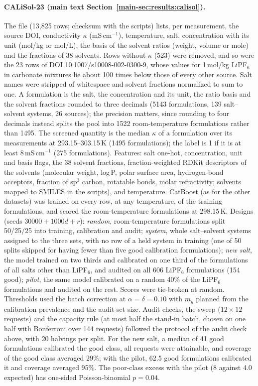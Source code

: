 \documentclass[10pt]{article}
\begin{document}
\paragraph{CALiSol-23 (main text Section~\ref{main-sec:results:calisol}).} The file (13,825 rows; checksum with the scripts) lists, per measurement, the source DOI, conductivity $\kappa$ (mS\,cm$^{-1}$), temperature, salt, concentration with its unit (mol/kg or mol/L), the basis of the solvent ratios (weight, volume or mole) and the fractions of 38 solvents.\citep{deBlasio2024CALiSol} Rows without $\kappa$ (523) were removed, and so were the 23 rows of DOI 10.1007/s10008-002-0300-9, whose values for 1\,mol/kg LiPF$_6$ in carbonate mixtures lie about 100 times below those of every other source. Salt names were stripped of whitespace and solvent fractions normalized to sum to one. A formulation is the salt, the concentration and its unit, the ratio basis and the solvent fractions rounded to three decimals (5143 formulations, 139 salt--solvent systems, 26 sources); the precision matters, since rounding to four decimals instead splits the pool into 1522 room-temperature formulations rather than 1495. The screened quantity is the median $\kappa$ of a formulation over its measurements at 293.15--303.15\,K (1495 formulations); the label is 1 if it is at least 8\,mS\,cm$^{-1}$ (275 formulations). Features: salt one-hot, concentration, unit and basis flags, the 38 solvent fractions, fraction-weighted RDKit descriptors of the solvents (molecular weight, log\,P, polar surface area, hydrogen-bond acceptors, fraction of sp$^3$ carbon, rotatable bonds, molar refractivity; solvents mapped to SMILES in the scripts), and temperature. CatBoost (as for the other datasets) was trained on every row, at any temperature, of the training formulations, and scored the room-temperature formulations at 298.15\,K. Designs (seeds $30000+1000d+r$): \emph{random}, room-temperature formulations split 50/25/25 into training, calibration and audit; \emph{system}, whole salt--solvent systems assigned to the three sets, with no row of a held system in training (one of 50 splits skipped for having fewer than five good calibration formulations); \emph{new salt}, the model trained on two thirds and calibrated on one third of the formulations of all salts other than LiPF$_6$, and audited on all 606 LiPF$_6$ formulations (154 good); \emph{pilot}, the same model calibrated on a random 40\% of the LiPF$_6$ formulations and audited on the rest. Scores were tie-broken at random. Thresholds used the batch correction at $\alpha=\delta=0.10$ with $m_y$ planned from the calibration prevalence and the audit-set size. Audit checks, the sweep ($12\times12$ requests) and the capacity rule (at most half the stand-in batch, chosen on one half with Bonferroni over 144 requests) followed the protocol of the audit check above, with 20 halvings per split. For the new salt, a median of 41 good formulations calibrated the good class, all requests were attainable, and coverage of the good class averaged 29\%; with the pilot, 62.5 good formulations calibrated it and coverage averaged 95\%. The poor-class excess with the pilot (8 against 4.0 expected) has one-sided Poisson-binomial $p=0.04$.
\end{document}
